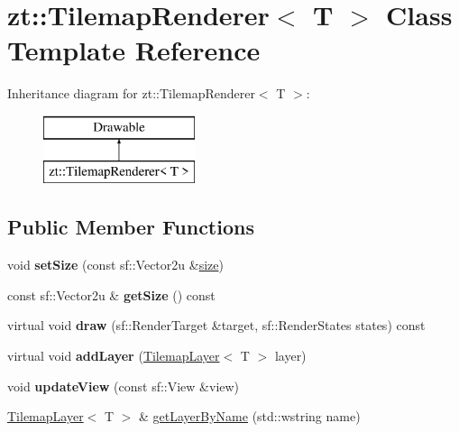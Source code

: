 \hypertarget{classzt_1_1_tilemap_renderer}{}\section{zt\+:\+:Tilemap\+Renderer$<$ T $>$ Class Template Reference}
\label{classzt_1_1_tilemap_renderer}
Inheritance diagram for zt\+:\+:Tilemap\+Renderer$<$ T $>$\+:\begin{figure}[H]
\begin{center}
\leavevmode
\includegraphics[height=2.000000cm]{classzt_1_1_tilemap_renderer}
\end{center}
\end{figure}
\subsection*{Public Member Functions}
\begin{DoxyCompactItemize}
\item 
\mbox{\label{classzt_1_1_tilemap_renderer_a9feb81534e16c96ce3e3ee5670662daa}} 
void {\bfseries set\+Size} (const sf\+::\+Vector2u \&\hyperlink{classzt_1_1_tilemap_renderer_a41d82c316bae652d144415dcbb7b3fd0}{size})
\item 
\mbox{\label{classzt_1_1_tilemap_renderer_a5cf40934d8a8bf79347a111b8f47268c}} 
const sf\+::\+Vector2u \& {\bfseries get\+Size} () const
\item 
\mbox{\label{classzt_1_1_tilemap_renderer_ad6f065fa9f0779c83017428e084f20ff}} 
virtual void {\bfseries draw} (sf\+::\+Render\+Target \&target, sf\+::\+Render\+States states) const
\item 
\mbox{\label{classzt_1_1_tilemap_renderer_a62ff3f11368b2ee9de0d3b3c55e5b671}} 
virtual void {\bfseries add\+Layer} (\hyperlink{classzt_1_1_tilemap_layer}{Tilemap\+Layer}$<$ T $>$ layer)
\item 
\mbox{\label{classzt_1_1_tilemap_renderer_a13eab06fa00e6017bc3754309d689ccb}} 
void {\bfseries update\+View} (const sf\+::\+View \&view)
\item 
\hyperlink{classzt_1_1_tilemap_layer}{Tilemap\+Layer}$<$ T $>$ \& \hyperlink{classzt_1_1_tilemap_renderer_ad6e938ecae5da3fc70c2e4e36254bf73}{get\+Layer\+By\+Name} (std\+::wstring name)
\end{DoxyCompactItemize}
